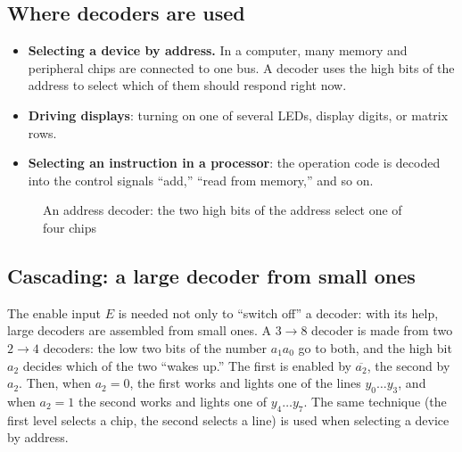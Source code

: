 \subsection{Where decoders are used}

\begin{itemize}
  \item \textbf{Selecting a device by address.} In a computer, many memory and
        peripheral chips are connected to one bus. A decoder uses the
        high bits of the address to select which of them should respond right now.
  \item \textbf{Driving displays}: turning on one of several
        LEDs, display digits, or matrix rows.
  \item \textbf{Selecting an instruction in a processor}: the operation code is decoded into
        the control signals ``add,'' ``read from memory,'' and so on.
\end{itemize}

\begin{figure}[H]
\centering
{}
\caption{An address decoder: the two high bits of the address select one of four chips}
\end{figure}

\subsection{Cascading: a large decoder from small ones}

The enable input $E$ is needed not only to ``switch off'' a decoder: with its help,
large decoders are assembled from small ones. A $3\to8$ decoder is made from
two $2\to4$ decoders: the low two bits of the number $a_1a_0$ go to
both, and the high bit $a_2$ decides which of the two ``wakes up.'' The first
is enabled by $\overline{a_2}$, the second by $a_2$. Then, when $a_2=0$, the
first works and lights one of the lines $y_0\ldots y_3$, and when $a_2=1$ the second works and
lights one of $y_4\ldots y_7$. The same technique (the first level selects
a chip, the second selects a line) is used when selecting a device by address.

